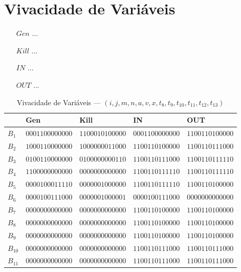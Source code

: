 \section{Vivacidade de Vari\'aveis}

\begin{itemize}
  \item[$Gen$] ...
  \item[$Kill$] ...
  \item[$IN$] ...
  \item[$OUT$] ...
\end{itemize}



\begin{table}[ht]
\centering
\begin{tabular}{l|l|l|l|l}
	& Gen & Kill & IN & OUT\\
\hline
$B_{1}$ &  $0001100000000$ & $1100010100000$ & $0001100000000$ & $1100110100000$\\
$B_{2}$ &  $1000110000000$ & $1000000011000$ & $1100110100000$ & $1100110111000$\\
$B_{3}$ &  $0100110000000$ & $0100000000110$ & $1100110111000$ & $1100110111110$\\
$B_{4}$ &  $1100000000000$ & $0000000000000$ & $1100110111110$ & $1100110111110$\\
$B_{5}$ &  $0000100011110$ & $0000001000000$ & $1100110111110$ & $1100110100000$\\
$B_{6}$ &  $0000100111000$ & $0000001000001$ & $0000100111000$ & $0000000000000$\\
$B_{7}$ &  $0000000000000$ & $0000000000000$ & $1100110100000$ & $1100110100000$\\
$B_{8}$ &  $0000000000000$ & $0000000000000$ & $1100110100000$ & $1100110100000$\\
$B_{9}$ &  $0000000000000$ & $0000000000000$ & $1100110100000$ & $1100110100000$\\
$B_{10}$ &  $0000000000000$ & $0000000000000$ & $1100110111000$ & $1100110111000$\\
$B_{11}$ &  $0000000000000$ & $0000000000000$ & $1100110111000$ & $1100110111000$\\
\end{tabular}
\caption{Vivacidade de Vari\'aveis --- $(i, j, m, n, a, v, x, t_{8}, t_{9}, t_{10}, t_{11}, t_{12}, t_{13})$}
\end{table}

